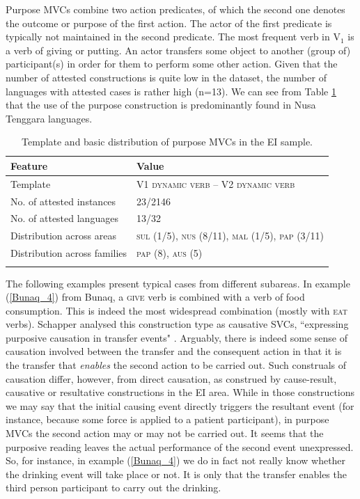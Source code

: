 Purpose MVCs combine two action predicates, of which the second one denotes the outcome or purpose of the first action. The actor of the first predicate is typically not maintained in the second predicate. The most frequent verb in V$_1$ is a verb of giving or putting. An actor transfers some object to another (group of) participant(s) in order for them to perform some other action. Given that the number of attested constructions is quite low in the dataset, the number of languages with attested cases is rather high (n=13). We can see from Table \ref{table:purpose} that the use of the purpose construction is predominantly found in Nusa Tenggara languages.

\begin{table}
\begin{tabular}{ll}
\lsptoprule
Feature&Value\tabularnewline
\midrule
Template& V1 \textsc{dynamic verb} -- V2 \textsc{dynamic verb}\tabularnewline
No. of attested instances& 23/2146 \tabularnewline
No. of attested languages& 13/32 \tabularnewline
Distribution across areas& \textsc{sul} (1/5), \textsc{nus} (8/11), \textsc{mal} (1/5), \textsc{pap} (3/11) \tabularnewline
Distribution across families& \textsc{pap} (8), \textsc{aus} (5) \tabularnewline
\lspbottomrule
\end{tabular}
\caption[Template and basic distribution of purpose MVCs]{Template and basic distribution of purpose MVCs in the EI sample.}
\label{table:purpose}
\end{table}

The following examples present typical cases from different subareas. In example (\ref{Bunaq_4}) from Bunaq, a \textsc{give} verb is combined with a verb of food consumption. This is indeed the most widespread combination (mostly with \textsc{eat} verbs). Schapper analysed this construction type as causative SVCs, ``expressing purposive causation in transfer events" \citep[446]{schapper2009bunaq}. Arguably, there is indeed some sense of causation involved between the transfer and the consequent action in that it is the transfer that \emph{enables} the second action to be carried out. Such construals of causation differ, however, from direct causation, as construed by cause-result, causative or resultative constructions in the EI area. While in those constructions we may say that the initial causing event directly triggers the resultant event (for instance, because some force is applied to a patient participant), in purpose MVCs the second action may or may not be carried out. It seems that the purposive reading leaves the actual performance of the second event unexpressed. So, for instance, in example (\ref{Bunaq_4}) we do in fact not really know whether the drinking event will take place or not. It is only that the transfer enables the third person participant to carry out the drinking. 

